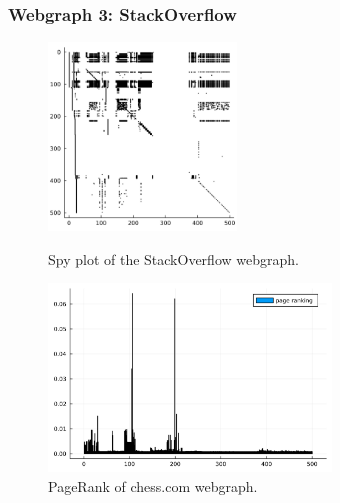 \documentclass[unicode,11pt,a4paper,oneside,numbers=endperiod,openany]{scrartcl}
\begin{document}
\subsubsection{Webgraph 3: StackOverflow}
\begin{figure}[!h]
    \begin{minipage}{0.5\textwidth}
        \centering
        \includegraphics[height=5cm]{fig/StackOverflow.jpg}
        \caption{Spy plot of the StackOverflow webgraph.}
        \label{fig:StackOverflow}
    \end{minipage}
    \begin{minipage}{0.5\textwidth}
        \centering
        \includegraphics[height=5cm]{fig/StackOverflow_pagerank.jpg}
        \caption{PageRank of chess.com webgraph.}
        \label{fig:StackOverflow_pagerank}
    \end{minipage}
\end{figure}
\end{document}
